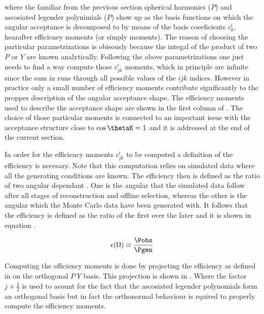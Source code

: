 \noindent where the familiar from the previous section spherical harmonics ($P$) and ascosiated legender polynimials ($P$) show up as the basis
functions on which the angular acceptance is decomposed to by means of the basis coeeficients $c^i_{k}$, hearafter efficicney moments (or simply moments). 
The reason of choosing the particular parametrizations is obisously because the integal of the product of two $P$ or $Y$ are known analytically. 
Following the above parametrizations one just needs to find a way compute those $c^i_{jk}$ moments, which in principle are infinite since the 
sum in  runs through all possible values of the $ijk$ indices. However in practice only a small number of efficiency moments 
contribute significantly to the propper description of the angular acceptance shape. The efficiency moments used to describe the acceptance 
shape are shown in the first column of . The choice of those particular moments is connected to an important issue with the acceptance 
structure close to $\cos\thetaK=1$ and it is addressed at the end of the current section.   

In order for the efficiency moments $c^i_{jk}$ to be computed a definition of the efficiency is necesary. Note that this computation relies on 
simulated data where all the generating conditions are known. The efficiency then is defined as the ratio of two angular dependant \pdfs. 
One is the angular \pdf that the simulated data follow after all stages of reconstruction and offline selection, whereas the other is the 
angular \pdf which the Monte Carlo data have been generated with. It follows that the efficiency is defined as the ratio of the first
over the later and it is shown in equation .

\begin{center}
\begin{equation}
  \epsilon(\Omega) \equiv \frac{\Pobs}{\Pgen}
  \label{eff_def}
\end{equation}
\end{center}

\noindent Computing the efficiency moments is done by projecting the efficiency as defined in  on the orthogonal $P\;Y$ basis.
This projection is shown in . Where the factor $j+\frac{1}{2}$ is used to acount for the fact that the ascosiated legender 
polynomials form an orthogonal basis but in fact the orthonormal behaviour is rquired to properly compute the efficiency moments. 


